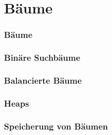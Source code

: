 \documentclass[xcolor=dvipsnames]{beamer}
\subtitle{Baumstrukturen}
\begin{document}
\maketitle

\part{Bäume}

\section{Bäume}
	
\section{Binäre Suchbäume}
			
		
\section{Balancierte Bäume}
	
	
	
	


\section{Heaps}
	
	
	

\section{Speicherung von Bäumen}
	
\end{document}
